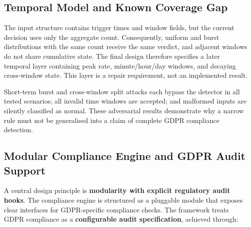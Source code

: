\subsection{Temporal Model and Known Coverage Gap}

The input structure contains trigger times and window fields, but the current decision uses only the aggregate count. Consequently, uniform and burst distributions with the same count receive the same verdict, and adjacent windows do not share cumulative state. The final design therefore specifies a later temporal layer containing peak rate, minute/hour/day windows, and decaying cross-window state. This layer is a repair requirement, not an implemented result.

Short-term burst and cross-window split attacks each bypass the detector in all tested scenarios; all invalid time windows are accepted; and malformed inputs are silently classified as normal. These adversarial results demonstrate why a narrow rule must not be generalised into a claim of complete GDPR compliance detection.

\subsection{Modular Compliance Engine and GDPR Audit Support}

A central design principle is \textbf{modularity with explicit regulatory audit hooks}. The compliance engine is structured as a pluggable module that exposes clear interfaces for GDPR-specific compliance checks. The framework treats GDPR compliance as a \textbf{configurable audit specification}, achieved through:

